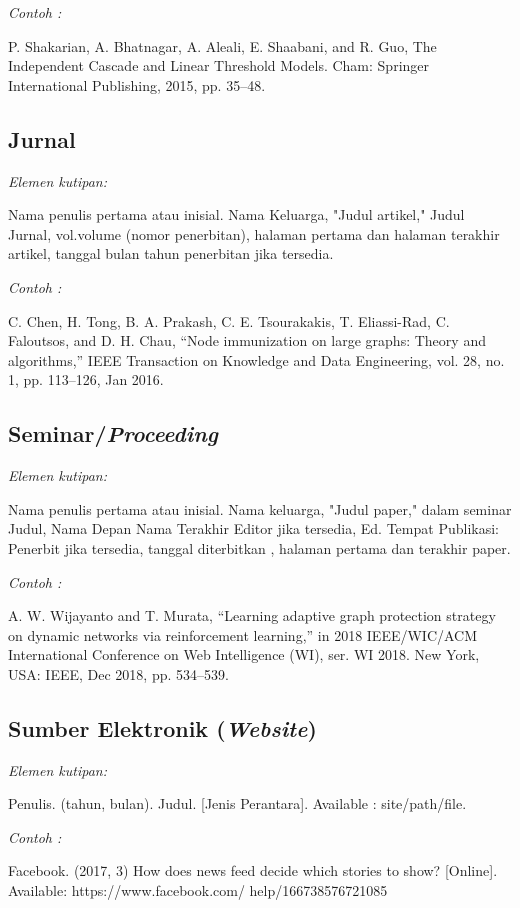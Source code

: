 \documentclass[conference, a4paper]{IEEEtran_ID}
\begin{document}
	\textit{Contoh \cite{pustaka2}:}

	P. Shakarian, A. Bhatnagar, A. Aleali, E. Shaabani, and R. Guo, The Independent Cascade and Linear Threshold Models. Cham: Springer International Publishing, 2015, pp. 35–48.

\subsection{Jurnal}

	\textit{Elemen kutipan:}

	Nama penulis pertama atau inisial. Nama Keluarga, "Judul artikel," Judul Jurnal, vol.volume (nomor penerbitan), halaman pertama dan halaman terakhir artikel, tanggal bulan tahun penerbitan jika tersedia.

	\textit{Contoh \cite{pustaka3}:}

	C. Chen, H. Tong, B. A. Prakash, C. E. Tsourakakis, T. Eliassi-Rad, C. Faloutsos, and D. H. Chau, “Node immunization on large graphs: Theory and algorithms,” IEEE Transaction on Knowledge and Data Engineering, vol. 28, no. 1, pp. 113–126, Jan 2016.

\subsection{Seminar/\textit{Proceeding}}

	\textit{Elemen kutipan:}

	Nama penulis pertama atau inisial. Nama keluarga, "Judul paper," dalam seminar Judul, Nama Depan Nama Terakhir Editor jika tersedia, Ed. Tempat Publikasi: Penerbit jika tersedia,  tanggal diterbitkan , halaman pertama dan terakhir paper.

	\textit{Contoh \cite{pustaka4}:}

	A. W. Wijayanto and T. Murata, “Learning adaptive graph protection strategy on dynamic networks via reinforcement learning,” in 2018 IEEE/WIC/ACM International Conference on Web Intelligence (WI), ser. WI 2018. New York, USA: IEEE, Dec 2018, pp. 534–539.

\subsection{Sumber Elektronik (\textit{Website})}

	\textit{Elemen kutipan:}

	Penulis. (tahun, bulan). Judul. [Jenis Perantara]. Available : site/path/file.

	\textit{Contoh \cite{pustaka5}:}

	Facebook. (2017, 3) How does news feed decide which stories to show? [Online]. Available: https://www.facebook.com/ help/166738576721085
	


\end{document}
